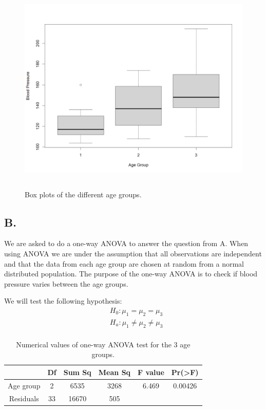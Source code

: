 \documentclass[a4paper,12pt]{article}
\begin{document}
\begin{figure}[H]
\centerline{\includegraphics[width=5in, height=4in]{boxplot(2A).png}}
\caption{Box plots of the different age groups.}
\label{fig}
\end{figure}

\subsection*{B. }
We are asked to do a one-way ANOVA to answer the question from A. When using ANOVA we are under the assumption that all observations are independent and that the data from each age group are chosen at random from a normal distributed population. The purpose of the one-way ANOVA is to check if blood pressure varies between the age groups. \


We will test the following hypothesis:
 \begin{equation} 
\begin{split}
&H_0:\mu_1=\mu_2=\mu_3\\
&H_a:\mu_1 \neq \mu_2 \neq \mu_3\\
\end{split}
\end{equation}

 
\begin{table}[H]
\caption{Numerical values of one-way ANOVA test for the 3 age groups.} 
\centering 
\begin{tabular}{c c c c c c } 
\hline\hline 
  & Df & Sum Sq &Mean Sq & F value &Pr(>F)       \\ [0.5ex] 
\hline 
Age group     &2      &6535     &3268 &6.469&0.00426 \\
Residuals        &33   &16670   &505   &        & \\ [1ex] 
\hline\hline
\end{tabular}
\end{table}
\end{document}
